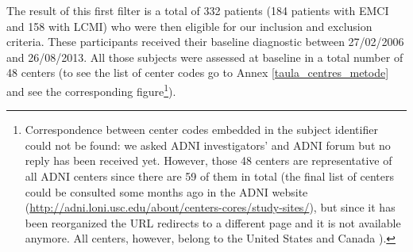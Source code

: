 \documentclass[a4paper,12pt]{elsarticle}  %
\begin{document}
	
	The result of this first filter is a total of 332 patients (184 patients with EMCI and 158 with LCMI) who were then eligible for our inclusion and exclusion criteria. These participants received their baseline diagnostic between 27/02/2006 and 26/08/2013. All those subjects were assessed at baseline in a total number of 48 centers (to see the list of center codes go to Annex \ref{taula_centres_metode} and see the corresponding figure\footnote{Correspondence between center codes embedded in the subject identifier could not be found: we asked ADNI investigators' and ADNI forum but no reply has been received yet. However, those 48 centers are representative of all ADNI centers since there are 59 of them in total (the final list of centers could be consulted some months ago in the ADNI website (\href{http://adni.loni.usc.edu/about/centers-cores/study-sites/}{http://adni.loni.usc.edu/about/centers-cores/study-sites/}), but since it has been reorganized the URL redirects to a different page and it is not available anymore. All centers, however, belong to the United States and Canada \cite{adni2_protocol_extension}).}). 
	
\end{document}
